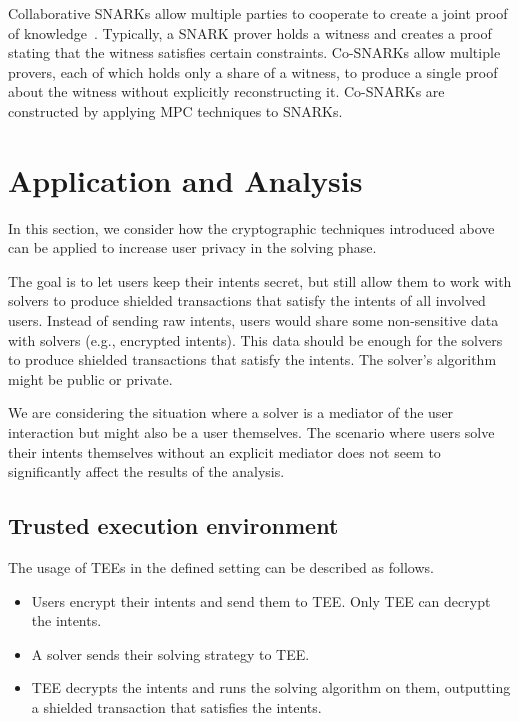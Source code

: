 \documentclass[
    9pt,            %
    report,        %
    affiltop,       %
]{art}
\begin{document}
Collaborative SNARKs allow multiple parties to cooperate to create a joint proof of knowledge~\citep{cosnarks}. Typically, a SNARK prover holds a witness and creates a proof stating that the witness satisfies certain constraints. Co-SNARKs allow multiple provers, each of which holds only a share of a witness, to produce a single proof about the witness without explicitly reconstructing it. Co-SNARKs are constructed by applying MPC techniques to SNARKs.

\section{Application and Analysis}\label{analysis}

In this section, we consider how the cryptographic techniques introduced above can be applied to increase user privacy in the solving phase.

The goal is to let users keep their intents secret, but still allow them to work with solvers to produce shielded transactions that satisfy the intents of all involved users. Instead of sending raw intents, users would share some non-sensitive data with solvers (e.g., encrypted intents). This data should be enough for the solvers to produce shielded transactions that satisfy the intents. The solver's algorithm might be public or private. 

We are considering the situation where a solver is a mediator of the user interaction but might also be a user themselves. The scenario where users solve their intents themselves without an explicit mediator does not seem to significantly affect the results of the analysis.

\subsection{Trusted execution environment}\label{TEE-expanded}

The usage of TEEs in the defined setting can be described as follows.

\begin{itemize}
    \item Users encrypt their intents and send them to TEE. Only TEE can decrypt the intents.
    \item A solver sends their solving strategy to TEE.
    \item TEE decrypts the intents and runs the solving algorithm on them, outputting a shielded transaction that satisfies the intents.
\end{itemize}
\end{document}
